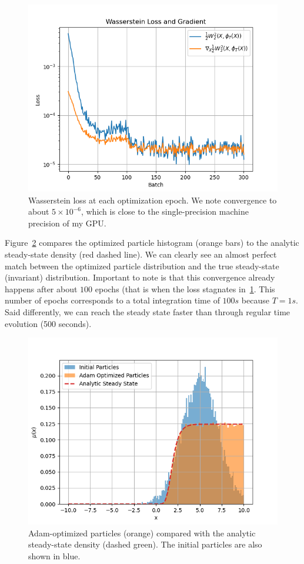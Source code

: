 \documentclass{article}
\begin{document}
\begin{figure}[ht!]
    \centering
    \includegraphics[width=0.8\linewidth]{figures/Wasserstein_Adam_Loss_Convergence.png}
    \caption{Wasserstein loss at each optimization epoch. We note convergence to about $5\times10^{-6}$, which is close to the single-precision machine precision of my GPU.}
    \label{fig:wasserstein_loss}
\end{figure}

Figure~\ref{fig:wasserstein_adam} compares the optimized particle histogram (orange bars) to the analytic steady‐state density (red dashed line). We can clearly see an almost perfect match between the optimized particle distribution and the true steady-state (invariant) distribution. Important to note is that this convergence already happens after about $100$ epochs (that is when the loss stagnates in~\ref{fig:wasserstein_loss}. This number of epochs corresponds to a total integration time of $100s$ because $T = 1s$. Said differently, we can reach the steady state faster than through regular time evolution (500 seconds). 

\begin{figure}[ht]
    \centering
    \includegraphics[width=0.8\linewidth]{figures/Wasserstein_Adam_Histograms.png}
    \caption{Adam-optimized particles (orange) compared with the analytic steady-state density (dashed green). The initial particles are also shown in blue.}
    \label{fig:wasserstein_adam}
\end{figure}
\end{document}

